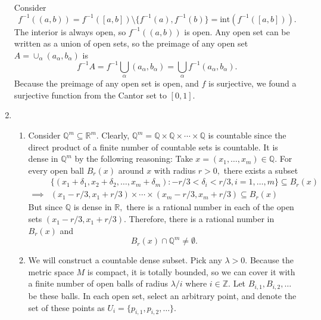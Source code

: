 \documentclass{article}
\numberwithin{equation}{section}
\begin{document}
\begin{enumerate}
    Consider 
    \begin{equation}
        f^{-1}((a,b)) = f^{-1}([a,b]) \setminus \{f^{-1}(a), f^{-1}(b)\} = \text{int}\left(f^{-1}([a,b])\right).
    \end{equation}
    The interior is always open, so $f^{-1}((a,b))$ is open. Any open set can be written as a union of open sets, so the preimage of any open set $A = \cup_\alpha (a_\alpha,b_\alpha)$ is 
    \begin{equation}
        f^{-1}A = f^{-1} \bigcup_\alpha (a_\alpha,b_\alpha) = \bigcup_\alpha f^{-1}(a_\alpha,b_\alpha).
    \end{equation}
    Because the preimage of any open set is open, and $f$ is surjective, we found a surjective function from the Cantor set to $[0,1].$
    \newpage
    \item \begin{enumerate}
        \item Consider $\mathbb{Q}^m \subseteq \mathbb{R}^m.$ Clearly, $\mathbb{Q}^m = \mathbb{Q} \times \mathbb{Q} \times \cdots \times \mathbb{Q}$ is countable since the direct product of a finite number of countable sets is countable. It is dense in $\mathbb{Q}^m$ by the following reasoning: Take $x=(x_1,\dots,x_m)\in \mathbb{Q}.$ For every open ball $B_r(x)$ around $x$ with radius $r>0,$ there exists a subset 
        \begin{align}
            &\{(x_1+\delta_1,x_2+\delta_2,\dots,x_m+\delta_m):-r/3<\delta_i<r/3, i=1,\dots,m\} \subseteq B_r(x)\\ 
            \implies & (x_1-r/3,x_1+r/3) \times \cdots \times (x_m - r/3,x_m+r/3) \subseteq B_r(x)
        \end{align}
        But since $\mathbb{Q}$ is dense in $\mathbb{R},$ there is a rational number in each of the open sets $(x_1-r/3,x_1+r/3).$ Therefore, there is a rational number in $B_r(x)$ and 
        \begin{equation}
            B_r(x) \cap \mathbb{Q}^m \neq \emptyset.
        \end{equation}
        \item We will construct a countable dense subset. Pick any $\lambda > 0.$ Because the metric space $M$ is compact, it is totally bounded, so we can cover it with a finite number of open balls of radius $\lambda/i$ where $i\in \mathbb{Z}.$ Let $B_{i,1},B_{i,2},\dots$ be these balls. In each open set, select an arbitrary point, and denote the set of these points as $U_{i}=\{p_{i,1},p_{i,2},\dots\}.$
        

\end{enumerate}
\end{enumerate}
\end{document}
